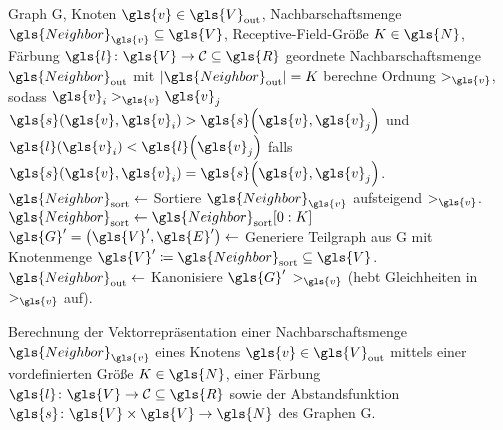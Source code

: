 \begin{algorithm}[t]
\centering
\begin{algorithmic}
  \REQUIRE{} Graph \gls{G}, Knoten $\gls{v} \in \gls{V}_{\mathrm{out}}$, Nachbarschaftsmenge $\gls{Neighbor}_{\gls{v}} \subseteq \gls{V}$, Receptive-Field-Größe $K \in \gls{N}$, Färbung $\gls{l} \colon \gls{V} \to \mathcal{C} \subseteq \gls{R}$
  \ENSURE{} geordnete Nachbarschaftsmenge $\gls{Neighbor}_{\mathrm{out}}$ mit $\left|\gls{Neighbor}_{\mathrm{out}}\right| = K$
  \STATE{} berechne Ordnung $>_{\gls{v}}$, sodass $\gls{v}_i >_{\gls{v}} \gls{v}_j$ \gdw{} $\gls{s}\left(\gls{v}, \gls{v}_i\right) > \gls{s}\left(\gls{v}, \gls{v}_j\right)$ und $\gls{l}\left(\gls{v}_i\right) < \gls{l}\left(\gls{v}_j\right)$ falls $\gls{s}\left(\gls{v}, \gls{v}_i\right) = \gls{s}\left(\gls{v}, \gls{v}_j\right)$.
  \STATE{} $\gls{Neighbor}_{\mathrm{sort}} \leftarrow$ Sortiere $\gls{Neighbor}_{\gls{v}}$ aufsteigend \bzgl{} $>_{\gls{v}}$.
    \STATE{} $\gls{Neighbor}_{\mathrm{sort}} \leftarrow \gls{Neighbor}_{\mathrm{sort}}\left[0:K\right]$
  \ENDIF{}
  \STATE{} $\gls{G}^{\prime} = \left(\gls{V}^{\prime}, \gls{E}^{\prime}\right) \leftarrow$ Generiere Teilgraph aus \gls{G} mit Knotenmenge $\gls{V}^{\prime} \coloneqq \gls{Neighbor}_{\mathrm{sort}} \subseteq \gls{V}$.
  \STATE{} $\gls{Neighbor}_{\mathrm{out}} \leftarrow$ Kanonisiere $\gls{G}^{\prime}$ \bzgl{} $>_{\gls{v}}$ (hebt Gleichheiten in $>_{\gls{v}}$ auf).
\end{algorithmic}
\caption[Normalisierung]{Berechnung der Vektorrepräsentation einer Nachbarschaftsmenge $\gls{Neighbor}_{\gls{v}}$ eines Knotens $\gls{v} \in \gls{V}_{\mathrm{out}}$ mittels einer vordefinierten Größe $K \in \gls{N}$, einer Färbung $\gls{l} \colon \gls{V} \to \mathcal{C} \subseteq \gls{R}$ sowie der Abstandsfunktion $\gls{s} \colon \gls{V} \times \gls{V} \to \gls{N}$ des Graphen \gls{G}.}
\label{alg:normalisierung}
\end{algorithm}

